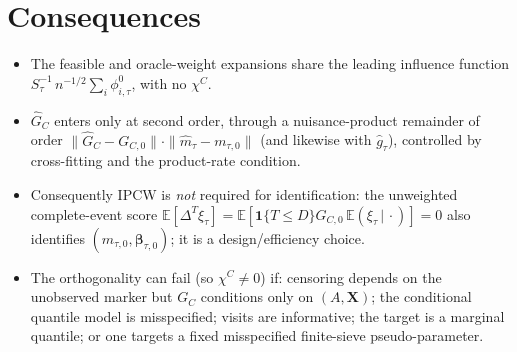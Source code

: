 \documentclass[11pt]{article}
\newcommand{\E}{\mathbb{E}}
\newcommand{\X}{\bm{X}}
\newcommand{\bbeta}{\bm{\beta}}
\newcommand{\indc}[1]{\mathbf{1}\{#1\}}
\newcommand{\given}{\,\vert\,}
\begin{document}
\section{Consequences}
\begin{itemize}
\item The feasible and oracle-weight expansions share the leading influence
function $S_\tau^{-1}\,n^{-1/2}\sum_i\phi^0_{i,\tau}$, with no $\chi^C$.
\item $\widehat G_C$ enters only at second order, through a nuisance-product
remainder of order $\|\widehat G_C-G_{C,0}\|\cdot\|\widehat m_\tau-m_{\tau,0}\|$
(and likewise with $\widehat g_\tau$), controlled by cross-fitting and the
product-rate condition.
\item Consequently IPCW is \emph{not} required for identification: the unweighted
complete-event score $\E[\Delta^T\xi_\tau]=\E[\indc{T\le D}G_{C,0}\,
\E(\xi_\tau\given\cdot)]=0$ also identifies $(m_{\tau,0},\bbeta_{\tau,0})$; it is
a design/efficiency choice.
\item The orthogonality can fail (so $\chi^C\neq0$) if: censoring depends on the
unobserved marker but $G_C$ conditions only on $(A,\X)$; the conditional quantile
model is misspecified; visits are informative; the target is a marginal quantile;
or one targets a fixed misspecified finite-sieve pseudo-parameter.
\end{itemize}
\end{document}
